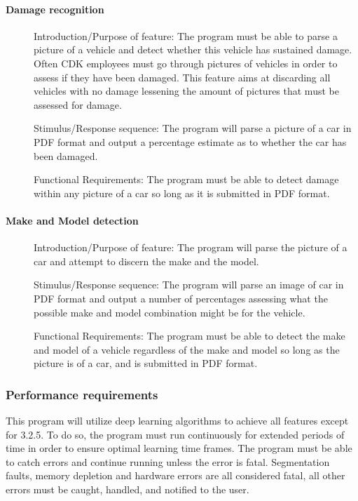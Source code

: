 \documentclass[article, onecolumn, draftclsnofoot,10pt, compsoc]{IEEEtran}
\begin{document}
\paragraph{Damage recognition}\vspace{.5cm}
\begin{description}
\item [] Introduction/Purpose of feature: The program must be able to parse a picture of a vehicle and detect whether this vehicle has sustained damage. Often CDK employees must go through pictures of vehicles in order to assess if they have been damaged. This feature aims at discarding all vehicles with no damage lessening the amount of pictures that must be assessed for damage. 
\item [] Stimulus/Response sequence: The program will parse a picture of a car in PDF format and output a percentage estimate as to whether the car has been damaged. 
\item [] Functional Requirements: The program must be able to detect damage within any picture of a car so long as it is submitted in PDF format.
\end{description}

\paragraph{Make and Model detection}\vspace{.5cm}
\begin{description}
\item [] Introduction/Purpose of feature: The program will parse the picture of a car and attempt to discern the make and the model.
\item [] Stimulus/Response sequence: The program will parse an image of car in PDF format and output a number of percentages assessing what the possible make and model combination might be for the vehicle. 
\item [] Functional Requirements: The program must be able to detect the make and model of a vehicle regardless of the make and model so long as the picture is of a car, and is submitted in PDF format. 
\end{description}

\subsubsection{Performance requirements}
This program will utilize deep learning algorithms to achieve all features except for 3.2.5. To do so, the program must run continuously for extended periods of time in order to ensure optimal learning time frames. The program must be able to catch errors and continue running unless the error is fatal. Segmentation faults, memory depletion and hardware errors are all considered fatal, all other errors must be caught, handled, and notified to the user. 
\end{document}
